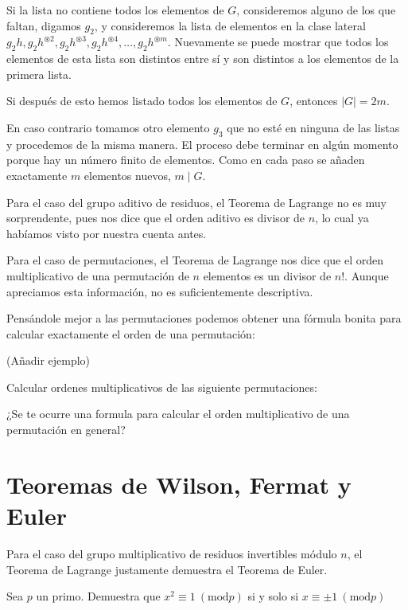 Si la lista no contiene todos los elementos de $G$, consideremos alguno de los que faltan, digamos $g_2$, y consideremos la lista de elementos en la clase lateral $g_2h, g_2h^{\circledast 2}, g_2h^{\circledast 3}, g_2h^{\circledast 4}, \dots, g_2h^{\circledast m}$. Nuevamente se puede mostrar que todos los elementos de esta lista son distintos entre sí y son distintos a los elementos de la primera lista. 

Si después de esto hemos listado todos los elementos de $G$, entonces $|G|=2m$. 

En caso contrario tomamos otro elemento $g_3$ que no esté en ninguna de las listas y procedemos de la misma manera. El proceso debe terminar en algún momento porque hay un número finito de elementos. Como en cada paso se añaden exactamente $m$ elementos nuevos, $m\mid G$.

Para el caso del grupo aditivo de residuos, el Teorema de Lagrange no es muy sorprendente, pues nos dice que el orden aditivo es divisor de $n$, lo cual ya habíamos visto por nuestra cuenta antes.

Para el caso de permutaciones, el Teorema de Lagrange nos dice que el orden multiplicativo de una permutación de $n$ elementos es un divisor de $n!$. Aunque apreciamos esta información, no es suficientemente descriptiva. 

Pensándole mejor a las permutaciones podemos obtener una fórmula bonita para calcular exactamente el orden de una permutación:

(Añadir ejemplo)

\begin{ejercicio}
Calcular ordenes multiplicativos de las siguiente permutaciones:
\end{ejercicio}

\begin{ejercicio}
¿Se te ocurre una formula para calcular el orden multiplicativo de una permutación en general?
\end{ejercicio}

\section{Teoremas de Wilson, Fermat y Euler}

Para el caso del grupo multiplicativo de residuos invertibles módulo $n$, el Teorema de Lagrange justamente demuestra el Teorema de Euler.

\begin{ejercicio}
Sea $p$ un primo. Demuestra que $x^2\equiv 1~(\mathrm {mod} p)$ si y solo si $x\equiv \pm 1~(\mathrm {mod} p
)$
\end{ejercicio}

